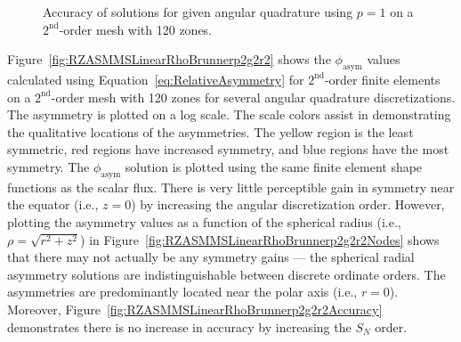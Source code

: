 \documentclass[12pt,letterpaper]{article}
\begin{document}
\begin{figure}[!htb]
\centering
{}
\caption{Accuracy of solutions for given angular quadrature using $p=1$ on a $2^\text{nd}$-order mesh with 120 zones.}
\label{fig:RZASMMSLinearRhoBrunnerp1g2r2Accuracy}
\end{figure}

\FloatBarrier

Figure~\ref{fig:RZASMMSLinearRhoBrunnerp2g2r2} shows the $\phi_\text{asym}$ values calculated using Equation~\ref{eq:RelativeAsymmetry} for $2^\text{nd}$-order finite elements on a $2^\text{nd}$-order mesh with 120 zones for several angular quadrature discretizations. The asymmetry is plotted on a log scale. The scale colors assist in demonstrating the qualitative locations of the asymmetries. The yellow region is the least symmetric, red regions have increased symmetry, and blue regions have the most symmetry. The $\phi_\text{asym}$ solution is plotted using the same finite element shape functions as the scalar flux. There is very little perceptible gain in symmetry near the equator (i.e., $z=0$) by increasing the angular discretization order. However, plotting the asymmetry values as a function of the spherical radius (i.e., $\rho=\sqrt{r^2+z^2}$) in Figure~\ref{fig:RZASMMSLinearRhoBrunnerp2g2r2Nodes} shows that there may not actually be any symmetry gains --- the spherical radial asymmetry solutions are indistinguishable between discrete ordinate orders. The asymmetries are predominantly located near the polar axis (i.e., $r=0$). Moreover, Figure~\ref{fig:RZASMMSLinearRhoBrunnerp2g2r2Accuracy} demonstrates there is no increase in accuracy by increasing the $S_N$ order.
\end{document}
